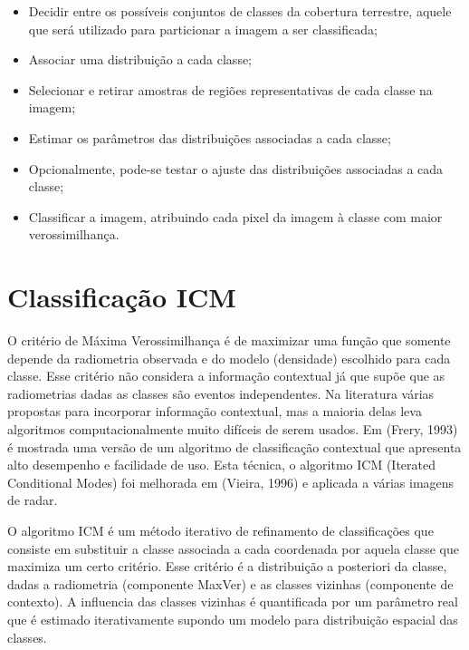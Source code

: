 \documentclass[a4paper, 12pt, english]{article}
\begin{document}
\begin{itemize}
   \item  Decidir entre os possíveis conjuntos de classes da cobertura terrestre, aquele que
será utilizado para particionar a imagem a ser classificada;
   \item  Associar uma distribuição a cada classe;
   \item Selecionar e retirar amostras de regiões representativas de cada classe na imagem;
   \item Estimar os parâmetros das distribuições associadas a cada classe;
   \item Opcionalmente, pode-se testar o ajuste das distribuições associadas a cada classe;
   \item Classificar a imagem, atribuindo cada pixel da imagem à classe com maior
verossimilhança.
 \end{itemize}


\section{Classificação ICM}

O critério de Máxima Verossimilhança é de maximizar uma função que somente
depende da radiometria observada e do modelo (densidade) escolhido para cada classe.
Esse critério não considera a informação contextual já que supõe que as radiometrias dadas as classes são eventos independentes. Na literatura várias propostas para incorporar
informação contextual, mas a maioria delas leva algoritmos computacionalmente muito
difíceis de serem usados. Em (Frery, 1993) é mostrada uma versão de um algoritmo de
classificação contextual que apresenta alto desempenho e facilidade de uso. Esta técnica,
o algoritmo ICM (Iterated Conditional Modes) foi melhorada em (Vieira, 1996) e aplicada a
várias imagens de radar.

O algoritmo ICM é um método iterativo de refinamento de classificações que consiste
em substituir a classe associada a cada coordenada por aquela classe que maximiza um
certo critério. Esse critério é a distribuição a posteriori da classe, dadas a radiometria
(componente MaxVer) e as classes vizinhas (componente de contexto). A influencia das
classes vizinhas é quantificada por um parâmetro real que é estimado iterativamente
supondo um modelo para distribuição espacial das classes.
\end{document}
